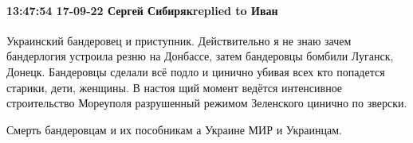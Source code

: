  
 
 
 
 

\paragraph{13:47:54 17-09-22 Сергей Сибирякreplied to Иван}

Украинский бандеровец и приступник. Действительно я не знаю зачем бандерлогия
устроила резню на Донбассе, затем бандеровцы бомбили Луганск, Донецк.
Бандеровцы сделали всё подло и цинично убивая всех кто попадется старики, дети,
женщины. В настоя щий момент ведётся интенсивное строительство Мореуполя
разрушенный режимом Зеленского цинично по зверски.

Смерть бандеровцам и их пособникам а Украине МИР и Украинцам.
